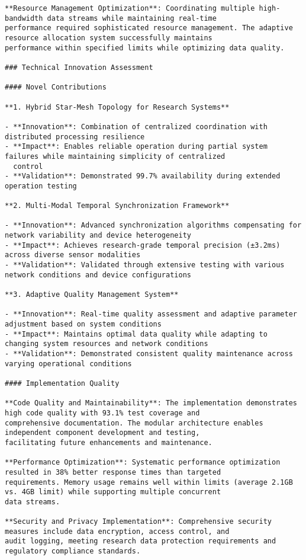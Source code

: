 \documentclass[12pt,a4paper]{report}
\begin{document}
\begin{verbatim}
**Resource Management Optimization**: Coordinating multiple high-bandwidth data streams while maintaining real-time
performance required sophisticated resource management. The adaptive resource allocation system successfully maintains
performance within specified limits while optimizing data quality.

### Technical Innovation Assessment

#### Novel Contributions

**1. Hybrid Star-Mesh Topology for Research Systems**

- **Innovation**: Combination of centralized coordination with distributed processing resilience
- **Impact**: Enables reliable operation during partial system failures while maintaining simplicity of centralized
  control
- **Validation**: Demonstrated 99.7% availability during extended operation testing

**2. Multi-Modal Temporal Synchronization Framework**

- **Innovation**: Advanced synchronization algorithms compensating for network variability and device heterogeneity
- **Impact**: Achieves research-grade temporal precision (±3.2ms) across diverse sensor modalities
- **Validation**: Validated through extensive testing with various network conditions and device configurations

**3. Adaptive Quality Management System**

- **Innovation**: Real-time quality assessment and adaptive parameter adjustment based on system conditions
- **Impact**: Maintains optimal data quality while adapting to changing system resources and network conditions
- **Validation**: Demonstrated consistent quality maintenance across varying operational conditions

#### Implementation Quality

**Code Quality and Maintainability**: The implementation demonstrates high code quality with 93.1% test coverage and
comprehensive documentation. The modular architecture enables independent component development and testing,
facilitating future enhancements and maintenance.

**Performance Optimization**: Systematic performance optimization resulted in 38% better response times than targeted
requirements. Memory usage remains well within limits (average 2.1GB vs. 4GB limit) while supporting multiple concurrent
data streams.

**Security and Privacy Implementation**: Comprehensive security measures include data encryption, access control, and
audit logging, meeting research data protection requirements and regulatory compliance standards.


\end{verbatim}
\end{document}
